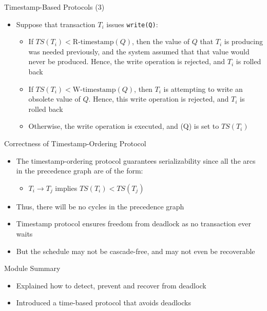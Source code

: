 \documentclass[aspectratio=169, xcolor=dvipsnames]{beamer}
\begin{document}
\begin{frame}{Timestamp-Based Protocols (3)}
    \begin{itemize}[<+->]
        \item Suppose that transaction $T_i$ issues \texttt{write(Q)}:
        \begin{itemize}
            \item[$\triangleright$] If $TS(T_i) < \text{R-timestamp}(Q)$, then the value of $Q$ that $T_i$ is producing was needed previously, and the system assumed that that value would never be produced. Hence, the write operation is rejected, and $T_i$ is rolled back
            \item[$\triangleright$] If $TS(T_i) < \text{W-timestamp}(Q)$, then $T_i$ is attempting to write an obsolete value of $Q$. Hence, this write operation is rejected, and $T_i$ is rolled back
            \item[$\triangleright$] Otherwise, the write operation is executed, and (Q) is set to $TS(T_i)$
        \end{itemize}
    \end{itemize}
\end{frame}

\begin{frame}{Correctness of Timestamp-Ordering Protocol}
    \begin{itemize}[<+->]
        \item The timestamp-ordering protocol guarantees serializability since all the arcs in the precedence graph are of the form:
        \begin{itemize}
            \item[$\triangleright$] $T_i \rightarrow T_j$ implies $TS(T_i) < TS(T_j)$
        \end{itemize}
        \item Thus, there will be no cycles in the precedence graph
        \item Timestamp protocol ensures freedom from deadlock as no transaction ever waits
        \item But the schedule may not be cascade-free, and may not even be recoverable
    \end{itemize}
\end{frame}

\begin{frame}{Module Summary}
    \begin{itemize}[<+->]
        \item Explained how to detect, prevent and recover from deadlock
        \item Introduced a time-based protocol that avoids deadlocks
    \end{itemize}
    \vspace{2em}
\end{frame}
\end{document}
